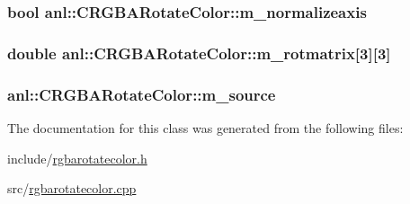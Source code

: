 \label{classanl_1_1CRGBARotateColor_a1280cb06da2c8117e9533146268b94a0}
\hypertarget{classanl_1_1CRGBARotateColor_a6e423929825dd606c63ee095f5dbc399}{
\subsubsection[{m\_\-normalizeaxis}]{\setlength{\rightskip}{0pt plus 5cm}bool {\bf anl::CRGBARotateColor::m\_\-normalizeaxis}}}
\label{classanl_1_1CRGBARotateColor_a6e423929825dd606c63ee095f5dbc399}
\hypertarget{classanl_1_1CRGBARotateColor_a2b7efae7aa4391a13469356713ccea4d}{
\subsubsection[{m\_\-rotmatrix}]{\setlength{\rightskip}{0pt plus 5cm}double {\bf anl::CRGBARotateColor::m\_\-rotmatrix}\mbox{[}3\mbox{]}\mbox{[}3\mbox{]}}}
\label{classanl_1_1CRGBARotateColor_a2b7efae7aa4391a13469356713ccea4d}
\hypertarget{classanl_1_1CRGBARotateColor_aa72ea19797c4f2328916d18308231844}{
\subsubsection[{m\_\-source}]{ {\bf anl::CRGBARotateColor::m\_\-source}}}
\label{classanl_1_1CRGBARotateColor_aa72ea19797c4f2328916d18308231844}


The documentation for this class was generated from the following files:\begin{DoxyCompactItemize}
\item 
include/\hyperlink{rgbarotatecolor_8h}{rgbarotatecolor.h}\item 
src/\hyperlink{rgbarotatecolor_8cpp}{rgbarotatecolor.cpp}\end{DoxyCompactItemize}
